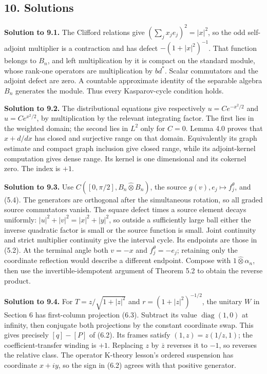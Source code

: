 \documentclass[
  11pt,
]{article}
\begin{document}
\subsection{10. Solutions}\label{solutions}

\textbf{Solution to 9.1.} The Clifford relations give
\((\sum_jx_je_j)^2=|x|^2\), so the odd self-adjoint multiplier is a
contraction and has defect \(-(1+|x|^2)^{-1}\). That function belongs to
\(B_n\), and left multiplication by it is compact on the standard
module, whose rank-one operators are multiplication by \(bd^*\). Scalar
commutators and the adjoint defect are zero. A countable approximate
identity of the separable algebra \(B_n\) generates the module. Thus
every Kasparov-cycle condition holds.

\textbf{Solution to 9.2.} The distributional equations give respectively
\(u=Ce^{-x^2/2}\) and \(u=Ce^{x^2/2}\), by multiplication by the
relevant integrating factor. The first lies in the weighted domain; the
second lies in \(L^2\) only for \(C=0\). Lemma 4.0 proves that
\(x+d/dx\) has closed and surjective range on that domain. Equivalently
its graph estimate and compact graph inclusion give closed range, while
its adjoint-kernel computation gives dense range. Its kernel is one
dimensional and its cokernel zero. The index is \(+1\).

\textbf{Solution to 9.3.} Use \(C([0,\pi/2],B_n\widehat\otimes B_n)\),
the source \(g(v),e_j\mapsto f_j^\theta\), and (5.4). The generators are
orthogonal after the simultaneous rotation, so all graded source
commutators vanish. The square defect times a source element decays
uniformly: \(|u|^2+|v|^2=|x|^2+|y|^2\), so outside a sufficiently large
ball either the inverse quadratic factor is small or the source function
is small. Joint continuity and strict multiplier continuity give the
interval cycle. Its endpoints are those in (5.2). At the terminal angle
both \(v=-x\) and \(f_j^\theta=-e_j\); retaining only the coordinate
reflection would describe a different endpoint. Compose with
\(1\widehat\otimes\alpha_n\), then use the invertible-idempotent
argument of Theorem 5.2 to obtain the reverse product.

\textbf{Solution to 9.4.} For \(T=z/\sqrt{1+|z|^2}\) and
\(r=(1+|z|^2)^{-1/2}\), the unitary \(W\) in Section 6 has first-column
projection (6.3). Subtract its value \(\operatorname{diag}(1,0)\) at
infinity, then conjugate both projections by the constant coordinate
swap. This gives precisely \([q]-[P]\) of (6.2). Its frames satisfy
\((1,z)=z(1/z,1)\); the coefficient-transfer winding is \(+1\).
Replacing \(z\) by \(\overline z\) reverses it to \(-1\), so reverses
the relative class. The operator K-theory lesson's ordered suspension
has coordinate \(x+iy\), so the sign in (6.2) agrees with that positive
generator.
\end{document}
